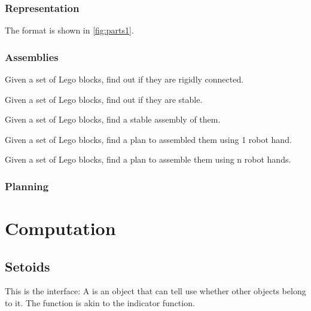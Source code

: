 \subsection*{Representation}


The format is shown in \cref{fig:parts1}.


\subsection{Assemblies}

\begin{exercise}
  Given a set of Lego blocks, find out if they are rigidly connected.
\end{exercise}

\begin{exercise}
  Given a set of Lego blocks, find out if they are stable.
\end{exercise}

\begin{exercise}
  Given a set of Lego blocks, find a stable assembly of them.
\end{exercise}

\begin{exercise}
  Given a set of Lego blocks, find a plan to assembled them using 1 robot hand.
\end{exercise}

\begin{exercise}
  Given a set of Lego blocks, find a plan to assemble them using n robot hands.
\end{exercise}

\subsection{Planning}



\chapter{Computation}


\section{Setoids}

This is the \Setoid interface:
%
%
A \Setoid is an object that can tell use whether other objects belong to it.
The  function is akin to the indicator function.


